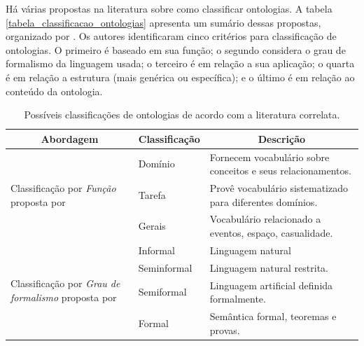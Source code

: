Há várias propostas na literatura sobre como classificar ontologias. A tabela \ref{tabela_classificacao_ontologias} apresenta um sumário dessas propostas, organizado por . Os autores identificaram cinco critérios para classificação de ontologias. O primeiro é baseado em sua função; o segundo considera o grau de formalismo da linguagem usada; o terceiro é em relação a sua aplicação; o quarta é em relação a estrutura (mais genérica ou específica); e o último é em relação ao conteúdo da ontologia.
\bgroup
\def\arraystretch{2}
\begin{table}[htbp]
\tiny
\centering
\caption{Possíveis classificações de ontologias de acordo com a literatura correlata.}
\begin{tabular}{lll}  \hline
\multicolumn{1}{c}{\textbf{Abordagem}} & \multicolumn{1}{c}{\textbf{Classificação}} &  \multicolumn{1}{c}{\textbf{Descrição}} \\  \hline
\multirow{3}{*}{\parbox{3cm}{Classificação por \emph{Função} proposta por }} 			& Domínio       		& Fornecem vocabulário sobre conceitos e seus relacionamentos. \\
				                   						& Tarefa        		& Provê vocabulário sistematizado para diferentes domínios.\\
				                   						& Gerais         		& Vocabulário relacionado a eventos, espaço, casualidade.  \\
\hline 
\multirow{4}{*}{\parbox{3cm}{Classificação por \emph{Grau de formalismo} proposta por  }} 	& Informal       		& Linguagem natural  \\ [0.1cm] 
										                & Seminformal        	& Linguagem natural restrita.     			 \\ 
										                & Semiformal         	& Linguagem artificial definida formalmente. \\ 
										                & Formal             	& Semântica formal, teoremas e provas.       \\ 
						                

\end{tabular}
\end{table}
